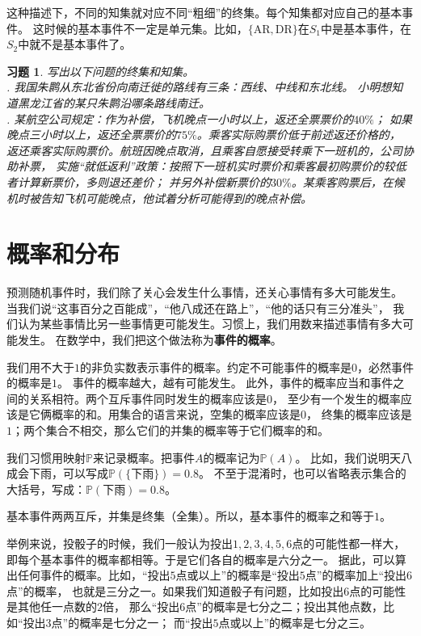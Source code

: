 \documentclass[12pt,UTF8]{ctexbook}
\newtheorem{xt}{习题}[section]
\begin{document}
这种描述下，不同的知集就对应不同“粗细”的终集。每个知集都对应自己的基本事件。
这时候的基本事件不一定是单元集。比如，$\{\mbox{AR}, \mbox{DR}\}$在$S_1$中是基本事件，在$S_2$中就不是基本事件了。

\begin{xt}
    写出以下问题的终集和知集。\\
    . 我国朱鹮从东北省份向南迁徙的路线有三条：西线、中线和东北线。
    小明想知道黑龙江省的某只朱鹮沿哪条路线南迁。\\
    . 某航空公司规定：作为补偿，飞机晚点一小时以上，返还全票票价的$40\%$；
    如果晚点三小时以上，返还全票票价的$75\%$。乘客实际购票价低于前述返还价格的，
    返还乘客实际购票价。航班因晚点取消，且乘客自愿接受转乘下一班机的，公司协助补票，
    实施“就低返利”政策：按照下一班机实时票价和乘客最初购票价的较低者计算新票价，多则退还差价；
    并另外补偿新票价的$30\%$。某乘客购票后，在候机时被告知飞机可能晚点，他试着分析可能得到的晚点补偿。
\end{xt}

\section{概率和分布}

预测随机事件时，我们除了关心会发生什么事情，还关心事情有多大可能发生。
当我们说“这事百分之百能成”，“他八成还在路上”，“他的话只有三分准头”，
我们认为某些事情比另一些事情更可能发生。习惯上，我们用数来描述事情有多大可能发生。
在数学中，我们把这个做法称为\textbf{事件的概率}。

我们用不大于$1$的非负实数表示事件的概率。约定不可能事件的概率是$0$，必然事件的概率是$1$。
事件的概率越大，越有可能发生。
此外，事件的概率应当和事件之间的关系相符。两个互斥事件同时发生的概率应该是$0$，
至少有一个发生的概率应该是它俩概率的和。用集合的语言来说，空集的概率应该是$0$，
终集的概率应该是$1$；两个集合不相交，那么它们的并集的概率等于它们概率的和。

我们习惯用映射$\mathbb{P}$来记录概率。把事件$A$的概率记为$\mathbb{P}(A)$。
比如，我们说明天八成会下雨，可以写成$\mathbb{P}(\{\mbox{下雨}\}) = 0.8$。
不至于混淆时，也可以省略表示集合的大括号，写成：$\mathbb{P}(\mbox{下雨}) = 0.8$。

基本事件两两互斥，并集是终集（全集）。所以，基本事件的概率之和等于$1$。

举例来说，投骰子的时候，我们一般认为投出$1,2,3,4,5,6$点的可能性都一样大，
即每个基本事件的概率都相等。于是它们各自的概率是六分之一。
据此，可以算出任何事件的概率。比如，“投出$5$点或以上”的概率是“投出$5$点”的概率加上“投出$6$点”的概率，
也就是三分之一。如果我们知道骰子有问题，比如投出$6$点的可能性是其他任一点数的$2$倍，
那么“投出$6$点”的概率是七分之二；投出其他点数，比如“投出$3$点”的概率是七分之一；
而“投出$5$点或以上”的概率是七分之三。
\end{document}
